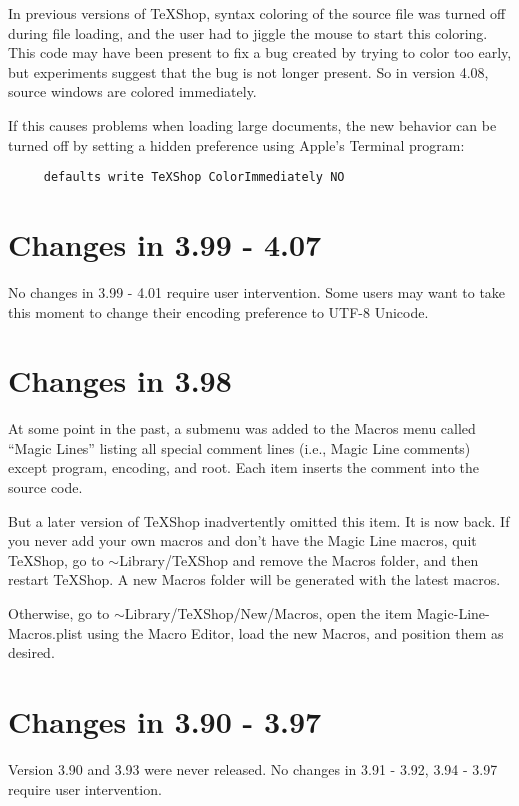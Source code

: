 \documentclass[11pt, oneside]{amsart}
\begin{document}
In previous versions of TeXShop, syntax coloring of the source file was turned off during file loading, and the user had to jiggle the mouse to start this coloring. This code may have been present to fix a bug created by trying to color too early, but experiments suggest that the bug is not longer present. So in version 4.08, source windows are colored immediately.

If this causes problems when loading large documents, the new behavior can be turned off by setting a hidden preference using Apple's Terminal program:
\begin{verbatim}
     defaults write TeXShop ColorImmediately NO
\end{verbatim}




\section{Changes in 3.99 - 4.07}

No changes in 3.99 - 4.01 require user intervention. Some users may want to take this moment to change their encoding preference to UTF-8 Unicode.

\section{Changes in 3.98}

At some point in the past, a submenu was added to the Macros menu called ``Magic Lines'' listing all special comment lines (i.e., Magic Line comments) except program, encoding, and root. Each item inserts the comment into the source code.

But a later version of TeXShop inadvertently omitted this item. It is now back. If you never add your own macros and don't have the Magic Line macros, quit TeXShop, go to $\sim$Library/TeXShop and remove the Macros folder, and then restart TeXShop. A new Macros folder will be generated with the latest macros.

Otherwise, go to $\sim$Library/TeXShop/New/Macros, open the item Magic-Line-Macros.plist using the Macro Editor, load the new Macros, and position them as desired.



\section{Changes in 3.90 - 3.97}

Version 3.90 and 3.93 were never released. No changes in 3.91 - 3.92, 3.94 - 3.97 require user intervention.
\end{document}
